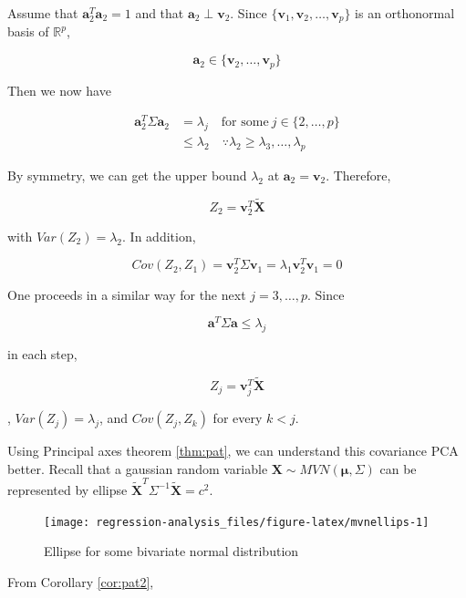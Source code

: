 \documentclass[]{book}
\theoremstyle{definition}
\theoremstyle{definition}
\theoremstyle{definition}
\theoremstyle{remark}
\begin{document}
Assume that \(\mathbf{a}_2^T \mathbf{a}_2 = 1\) and that \(\mathbf{a}_2 \perp \mathbf{v}_2\). Since \(\{ \mathbf{v}_1, \mathbf{v}_2, \ldots, \mathbf{v}_p \}\) is an orthonormal basis of \(\mathbb{R}^p\),

\[\mathbf{a}_2 \in \{ \mathbf{v}_2, \ldots, \mathbf{v}_p \}\]

Then we now have

\begin{equation*}
  \begin{split}
    \mathbf{a}_2^T \Sigma \mathbf{a}_2 & = \lambda_j \quad \text{for some}\: j \in \{ 2, \ldots, p \} \\
    & \le \lambda_2 \quad \because \lambda_2 \ge \lambda_3, \ldots, \lambda_p
  \end{split}
\end{equation*}

By symmetry, we can get the upper bound \(\lambda_2\) at \(\mathbf{a}_2 = \mathbf{v}_2\). Therefore,

\[Z_2 = \mathbf{v}_2^T \widetilde{\mathbf{X}}\]

with \(Var(Z_2) = \lambda_2\). In addition,

\[Cov(Z_2, Z_1) = \mathbf{v}_2^T \Sigma \mathbf{v}_1 = \lambda_1 \mathbf{v}_2^T \mathbf{v}_1 = 0\]

One proceeds in a similar way for the next \(j = 3, \ldots, p\). Since

\[\mathbf{a}^T \Sigma \mathbf{a} \le \lambda_j\]

in each step,

\[Z_j = \mathbf{v}_j^T \widetilde{\mathbf{X}}\]

, \(Var(Z_j) = \lambda_j\), and \(Cov(Z_j, Z_k)\) for every \(k < j\).

Using Principal axes theorem \ref{thm:pat}, we can understand this covariance PCA better. Recall that a gaussian random variable \(\mathbf{X} \sim MVN(\boldsymbol\mu, \Sigma)\) can be represented by ellipse \(\widetilde{\mathbf{X}}^T \Sigma^{-1} \widetilde{\mathbf{X}} = c^2\).

\begin{figure}[H]

{\centering \texttt{[image: regression-analysis\_files/figure-latex/mvnellips-1]} 

}

\caption{Ellipse for some bivariate normal distribution}\label{fig:mvnellips}
\end{figure}

From Corollary \ref{cor:pat2},
\end{document}
